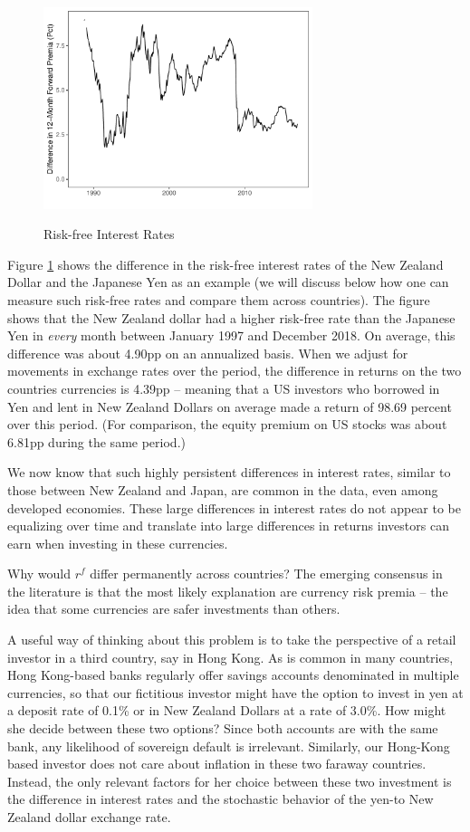 \documentclass{ar-1col}
\begin{document}
\begin{figure}
  \centering
  \caption{Risk-free Interest Rates}
  \includegraphics[width=0.7\textwidth]{Exhibits/Figure_FP12M_DiffJPYNZD.pdf}
  \label{fig:fp}
\end{figure}
Figure \ref{fig:fp} shows the difference in the risk-free interest rates of the New Zealand Dollar and the Japanese Yen as an example (we will discuss below how one can measure such risk-free rates and compare them across countries). The figure shows that the New Zealand dollar had a higher risk-free rate than the Japanese Yen in \textit{every} month between January 1997 and December 2018. On average, this difference was about 4.90pp on an annualized basis. When we adjust for movements in exchange rates over the period, the difference in returns on the two countries currencies is 4.39pp -- meaning that a US investors who borrowed in Yen and lent in New Zealand Dollars on average made a return of 98.69 percent over this period. (For comparison, the equity premium on US stocks was about 6.81pp during the same period.)

We now know that such highly persistent differences in interest rates, similar to those between New Zealand and Japan, are common in the data, even among developed economies. These large differences in interest rates do not appear to be equalizing over time and translate into large differences in returns investors can earn when investing in these currencies.

Why would $r^f$ differ permanently across countries? The emerging consensus in the literature is that the most likely explanation are currency risk premia -- the idea that some currencies are safer investments than others.

A useful way of thinking about this problem is to take the perspective of a retail investor in a third country, say in Hong Kong. As is common in many countries, Hong Kong-based banks regularly offer savings accounts denominated in multiple currencies, so that our fictitious investor might have the option to invest in yen at a deposit rate of 0.1\% or in New Zealand Dollars at a rate of 3.0\%. How might she decide between these two options? Since both accounts are with the same bank, any likelihood of sovereign default is irrelevant. Similarly, our Hong-Kong based investor does not care about inflation in these two faraway countries. Instead, the only relevant factors for her choice between these two investment is the difference in interest rates and the stochastic behavior of the yen-to New Zealand dollar exchange rate.
\end{document}
